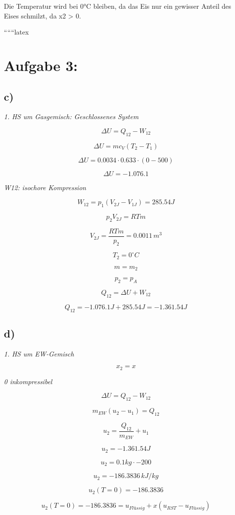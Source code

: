 Die Temperatur wird bei 0°C bleiben, da das Eis nur ein gewisser Anteil des Eises schmilzt, da x2 > 0.

``````latex


\section*{Aufgabe 3:}

\subsection*{c)}
\textit{1. HS um Gasgemisch: Geschlossenes System}

\[
\Delta U = Q_{12} - W_{12}
\]

\[
\Delta U = m c_V (T_2 - T_1)
\]

\[
\Delta U = 0.0034 \cdot 0.633 \cdot (0 - 500)
\]

\[
\Delta U = -1.076.1
\]

\textit{W12: isochore Kompression}

\[
W_{12} = p_1 \left( V_{2J} - V_{1J} \right) = 285.54 J
\]

\[
p_2 V_{2J} = R T m
\]

\[
V_{2J} = \frac{R T m}{p_2} = 0.0011 \, m^3
\]

\[
T_2 = 0^\circ C
\]

\[
m = m_2
\]

\[
p_2 = p_A
\]

\[
Q_{12} = \Delta U + W_{12}
\]

\[
Q_{12} = -1.076.1 J + 285.54 J = -1.361.54 J
\]

\subsection*{d)}
\textit{1. HS um EW-Gemisch}

\[
x_2 = x
\]

\textit{0 inkompressibel}

\[
\Delta U = Q_{12} - W_{12}
\]

\[
m_{EW} (u_2 - u_1) = Q_{12}
\]

\[
u_2 = \frac{Q_{12}}{m_{EW}} + u_1
\]

\[
u_2 = -1.361.54 J
\]

\[
u_2 = 0.1 kg \cdot -200
\]

\[
u_2 = -186.3836 \, kJ/kg
\]

\[
u_2 (T = 0) = -186.3836
\]

\[
u_2 (T = 0) = -186.3836 = u_{Flüssig} + x \left( u_{RST} - u_{Flüssig} \right)
\]

